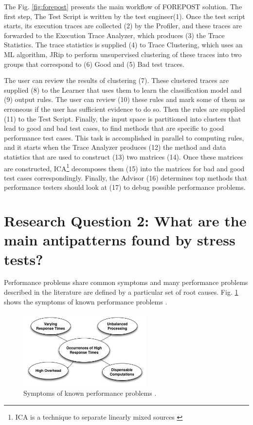\documentclass[espaco=umemeio,chapter=TITLE,twoside,openright]{abnt}
\begin{document}
The Fig. \ref{fig:forepost} presents the main workflow of FOREPOST solution. The first step,  The Test Script is written by the test engineer(1). Once the test script starts, its execution traces are collected (2) by the Profiler, and these traces are forwarded to the Execution Trace Analyzer, which produces (3) the Trace Statistics. The trace statistics is supplied (4) to Trace Clustering, which uses an ML algorithm, JRip to perform unsupervised clustering of these traces into two groups that correspond to (6) Good and (5) Bad test traces.

The user can review the results of clustering (7). These clustered traces are supplied (8) to the Learner that uses them to learn the classification model and (9) output rules. The user can review (10) these rules and mark some of them as erroneous if the user has sufficient evidence to do so. Then the rules are supplied (11) to the Test Script. Finally, the input space is partitioned into clusters that lead to good and bad test cases, to find methods that are specific to good performance test cases. This task is accomplished in parallel to computing rules, and it starts when the Trace Analyzer produces (12) the method and data statistics that are used to construct (13) two matrices (14). Once these matrices are constructed, ICA\footnote{ICA is a technique to separate linearly mixed sources \cite{Luo2015}} decomposes them (15) into the matrices for bad and good test cases correspondingly. Finally, the Advisor (16) determines top methods that performance testers should look at (17) to debug possible performance problems.

\section{Research Question 2: What are the main antipatterns found by stress tests?}

 Performance problems share common symptoms and many performance problems described in the literature are defined by a particular set of root causes. Fig. \ref{fig:symptoms}  shows the symptoms of known performance problems \cite{Wert2013a}.



\begin{figure}[h]
\centering
\includegraphics[width=0.6\textwidth]{./images/Symptoms.png}
\caption{Symptoms of known performance problems \cite{Wert2013a}. }
\label{fig:symptoms}
\end{figure}
\end{document}
